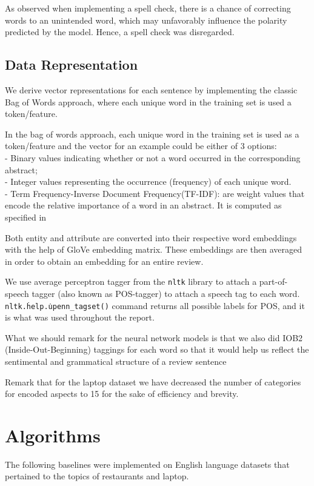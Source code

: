 \documentclass[comsoc,conference]{IEEEtran}
\begin{document}
As observed when implementing a spell check, there is a chance of correcting words to an unintended word, which may unfavorably influence the polarity predicted by the model. Hence, a spell check was disregarded.

\subsection{Data Representation}

We derive vector representations for each sentence by implementing the classic Bag of Words approach, where each unique word in the training set is used a token/feature.

In the bag of words approach, each unique word in the training set is used as a token/feature and the vector for an example could be either of 3 options:
\\- Binary values indicating whether or not a word occurred in the corresponding abstract;
\\- Integer values representing the occurrence (frequency) of each unique word.
\\- Term Frequency-Inverse Document Frequency(TF-IDF): are weight values that encode the relative importance of a word in an abstract. It is computed as specified in 

Both entity and attribute are converted into their respective word embeddings with the help of GloVe embedding matrix. These embeddings are then averaged in order to obtain an embedding for an entire review.


We use average perceptron tagger from the \texttt{nltk} library to attach a part-of-speech tagger (also known as POS-tagger) to attach a speech tag to each word. \texttt{nltk.\.help.\.upenn\_tagset()} command returns all possible labels for POS, and it is what was used throughout the report.
\par What we should remark for the neural network models is that we also did IOB2 (Inside-Out-Beginning) taggings for each word so that it would help us reflect the sentimental and grammatical structure of a review sentence
\par Remark that for the laptop dataset we have decreased the number of categories for encoded aspects to 15 for the sake of efficiency and brevity. 

\section{Algorithms}
The following baselines were implemented on English language datasets that pertained to the topics of restaurants and laptop.
\end{document}
